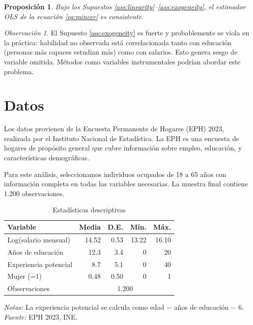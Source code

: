 \documentclass[12pt, a4paper]{article}
\newtheorem{proposition}[theorem]{Proposición}
\theoremstyle{definition}
\theoremstyle{remark}
\newtheorem{remark}{Observación}
\begin{document}
\begin{proposition}
  \label{prop:ols_consistency}
  Bajo los Supuestos \ref{ass:linearity}--\ref{ass:exogeneity}, el estimador 
  OLS de la ecuación \eqref{eq:mincer} es consistente.
\end{proposition}

\begin{remark}
  El Supuesto \ref{ass:exogeneity} es fuerte y probablemente se viola en la 
  práctica: habilidad no observada está correlacionada tanto con educación 
  (personas más capaces estudian más) como con salarios. Esto genera sesgo 
  de variable omitida. Métodos como variables instrumentales podrían abordar 
  este problema.
\end{remark}

\section{Datos}

Los datos provienen de la Encuesta Permanente de Hogares (EPH) 2023, realizada 
por el Instituto Nacional de Estadística. La EPH es una encuesta de hogares 
de propósito general que cubre información sobre empleo, educación, y 
características demográficas.

Para este análisis, seleccionamos individuos ocupados de 18 a 65 años con 
información completa en todas las variables necesarias. La muestra final 
contiene 1.200 observaciones.

\begin{table}[htbp]
  \centering
  \caption{Estadísticas descriptivas}
  \label{tab:desc}
  \begin{tabular}{lrrrr}
    \toprule
    Variable                    & Media  & D.E.   & Mín.  & Máx.  \\
    \midrule
    Log(salario mensual)        & 14.52  & 0.53   & 13.22 & 16.10 \\
    Años de educación           & 12.3   & 3.4    & 0     & 20    \\
    Experiencia potencial       & 8.7    & 5.1    & 0     & 40    \\
    Mujer (=1)                  & 0.48   & 0.50   & 0     & 1     \\
    \midrule
    Observaciones               & \multicolumn{4}{c}{1.200} \\
    \bottomrule
  \end{tabular}
  \begin{minipage}{\linewidth}
    \footnotesize \textit{Notas:} La experiencia potencial se calcula como 
    edad $-$ años de educación $-$ 6. \textit{Fuente:} EPH 2023, INE.
  \end{minipage}
\end{table}
\end{document}
